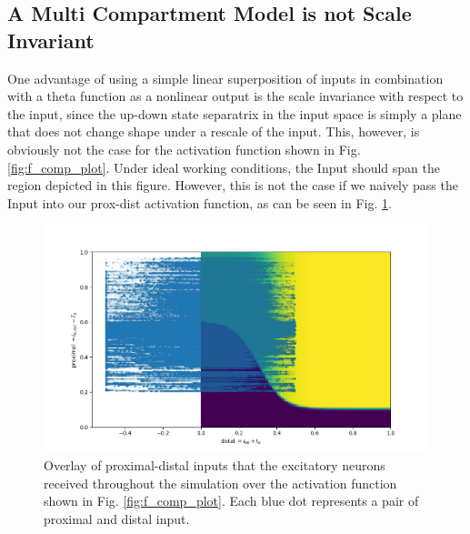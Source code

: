 \documentclass[10pt,a4paper]{article}
\begin{document}
\subsection{A Multi Compartment Model is not Scale Invariant}

One advantage of using a simple linear superposition of inputs in combination with a theta function as a nonlinear output is the scale invariance with respect to the input, since the up-down state separatrix in the input space is simply a plane that does not change shape under a rescale of the input. This, however, is obviously not the case for the activation function shown in Fig. \ref{fig:f_comp_plot}. Under ideal working conditions, the Input should span the region depicted in this figure. However, this is not the case if we naively pass the Input into our prox-dist activation function, as can be seen in Fig. \ref{fig:prox_dist_act_cloud}.

\begin{figure}
\includegraphics[width=\textwidth]{../plots/prox_dist_act_cloud.png}
\caption{\label{fig:prox_dist_act_cloud} Overlay of proximal-distal inputs that the excitatory neurons received throughout the simulation over the activation function shown in Fig. \ref{fig:f_comp_plot}. Each blue dot represents a pair of proximal and distal input.}
\end{figure}
\end{document}
